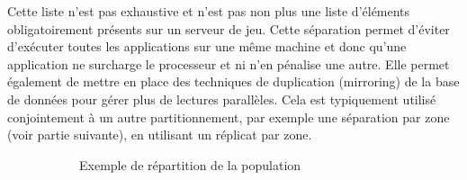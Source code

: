 Cette liste n'est pas exhaustive et n'est pas non plus une liste d'éléments obligatoirement présents sur un serveur de jeu.
Cette séparation permet d'éviter d'exécuter toutes les applications sur une même machine et donc qu'une application ne surcharge le processeur et ni n'en pénalise une autre.
Elle permet également de mettre en place des techniques de duplication (mirroring) de la base de données pour gérer plus de lectures parallèles.
Cela est typiquement utilisé conjointement à un autre partitionnement, par exemple une séparation par zone (voir partie suivante), en utilisant un réplicat par zone.

\begin{figure}[b!]
	\setlength{\fboxsep}{0pt}
		\centering
		\begin{subfigure}[t]{0.22\textwidth}
		\vspace{0pt}
			\caption{Exemple de répartition de la population}
			\label{fig:partitionnement_mono}
		\end{subfigure}
		~
		\begin{subfigure}[t]{0.22\textwidth}
		\vspace{0pt}

\end{subfigure}
\end{figure}
